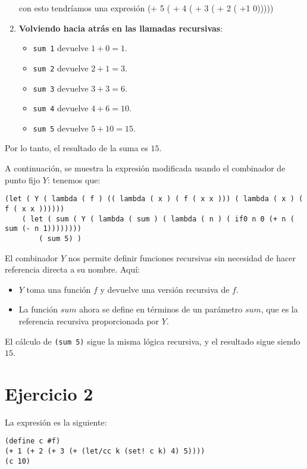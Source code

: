 \documentclass{article}
\begin{document}
\begin{enumerate}
    con esto tendríamos una expresión (+ 5 ( + 4 ( + 3 ( + 2 ( +1 0)))))
    
    \item \textbf{Volviendo hacia atrás en las llamadas recursivas}:
    \begin{itemize}
        \item \texttt{sum 1} devuelve \(1 + 0 = 1\).
        \item \texttt{sum 2} devuelve \(2 + 1 = 3\).
        \item \texttt{sum 3} devuelve \(3 + 3 = 6\).
        \item \texttt{sum 4} devuelve \(4 + 6 = 10\).
        \item \texttt{sum 5} devuelve \(5 + 10 = 15\).
    \end{itemize}
\end{enumerate}

Por lo tanto, el resultado de la suma es \( 15 \).

A continuación, se muestra la expresión modificada usando el combinador de punto fijo \( Y \):
tenemos que:

\begin{lstlisting}
(let ( Y ( lambda ( f ) (( lambda ( x ) ( f ( x x ))) ( lambda ( x ) ( f ( x x ))))))
    ( let ( sum ( Y ( lambda ( sum ) ( lambda ( n ) ( if0 n 0 (+ n ( sum (- n 1))))))))
        ( sum 5) )
\end{lstlisting}

El combinador \( Y \) nos permite definir funciones recursivas sin necesidad de hacer referencia directa a su nombre. Aquí:

\begin{itemize}
    \item \( Y \) toma una función \( f \) y devuelve una versión recursiva de \( f \).
    \item La función \( sum \) ahora se define en términos de un parámetro \( sum\), que es la referencia recursiva proporcionada por \( Y \).
\end{itemize}

El cálculo de \texttt{(sum 5)} sigue la misma lógica recursiva, y el resultado sigue siendo \( 15 \).

\section{Ejercicio 2}

La expresión es la siguiente:

\begin{lstlisting}
(define c #f)
(+ 1 (+ 2 (+ 3 (+ (let/cc k (set! c k) 4) 5))))
(c 10)
\end{lstlisting}
\end{document}
